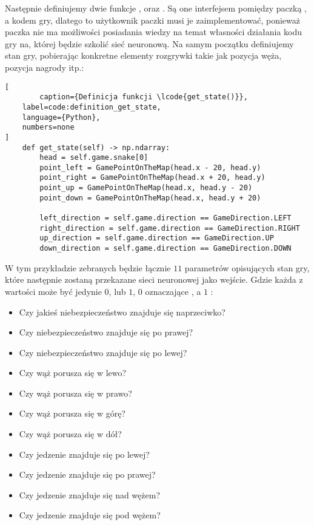 Następnie definiujemy dwie funkcje , oraz . Są one interfejsem pomiędzy paczką , a kodem gry, dlatego to użytkownik paczki musi je zaimplementować, ponieważ paczka nie ma możliwości posiadania wiedzy na temat własności działania kodu gry na, której będzie szkolić sieć neuronową. Na samym początku definiujemy stan gry, pobierając konkretne elementy rozgrywki takie jak pozycja węża, pozycja nagrody itp.:

\begin{onepage}
    \begin{lstlisting}[
        caption={Definicja funkcji \lcode{get_state()}},
    label=code:definition_get_state,
    language={Python},
    numbers=none
]
    def get_state(self) -> np.ndarray:
        head = self.game.snake[0]
        point_left = GamePointOnTheMap(head.x - 20, head.y)
        point_right = GamePointOnTheMap(head.x + 20, head.y)
        point_up = GamePointOnTheMap(head.x, head.y - 20)
        point_down = GamePointOnTheMap(head.x, head.y + 20)

        left_direction = self.game.direction == GameDirection.LEFT
        right_direction = self.game.direction == GameDirection.RIGHT
        up_direction = self.game.direction == GameDirection.UP
        down_direction = self.game.direction == GameDirection.DOWN
    \end{lstlisting}
\end{onepage}

W tym przykładzie zebranych będzie łącznie $11$ parametrów opisujących stan gry, które następnie zostaną przekazane sieci neuronowej jako wejście. Gdzie każda z wartości może być jedynie $0$, lub $1$, $0$ oznaczające , a $1$ :

\begin{itemize}
    \item Czy jakieś niebezpieczeństwo znajduje się naprzeciwko?
    \item Czy niebezpieczeństwo znajduje się po prawej?
    \item Czy niebezpieczeństwo znajduje się po lewej?
    \item Czy wąż porusza się w lewo?
    \item Czy wąż porusza się w prawo?
    \item Czy wąż porusza się w górę?
    \item Czy wąż porusza się w dół?
    \item Czy jedzenie znajduje się po lewej?
    \item Czy jedzenie znajduje się po prawej?
    \item Czy jedzenie znajduje się nad wężem?
    \item Czy jedzenie znajduje się pod wężem?
\end{itemize}


